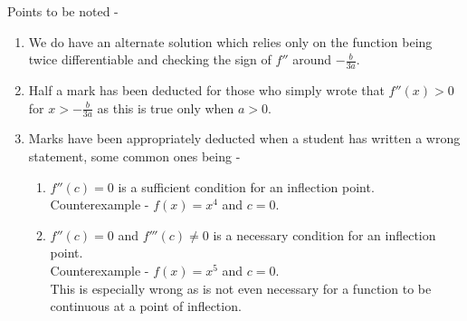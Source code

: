 \documentclass{article}
\begin{document}
Points to be noted -
\begin{enumerate}
	\item We do have an alternate solution which relies only on the function being twice differentiable and checking the sign of $f''$ around $-\frac{b}{3a}.$
	\item Half a mark has been deducted for those who simply wrote that $f''(x) > 0$ for $x > -\frac{b}{3a}$ as this is true only when $a > 0.$ 
	\item Marks have been appropriately deducted when a student has written a wrong statement, some common ones being - 
	\begin{enumerate}[nosep] 
		\item $f''(c) = 0$ is a sufficient condition for an inflection point.\\
		Counterexample - $f(x) = x^4$ and $c = 0.$
		\item $f''(c) = 0$ and $f'''(c) \neq 0$ is a necessary condition for an inflection point.\\
		Counterexample - $f(x) = x^5$ and $c = 0.$\\
		This is especially wrong as is not even necessary for a function to be continuous at a point of inflection.
	\end{enumerate}
\end{enumerate}
\end{document}
